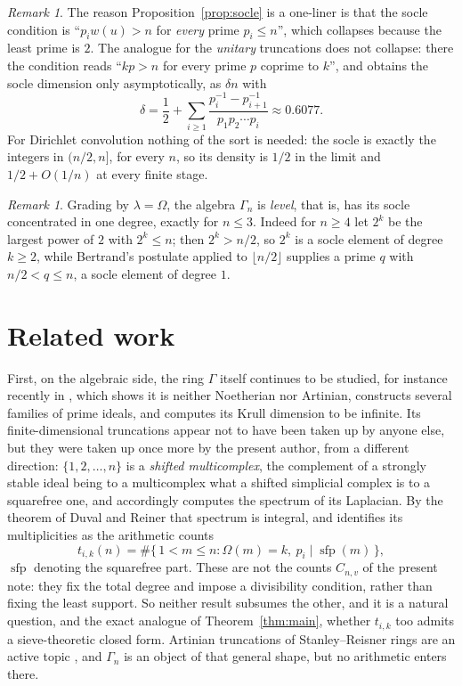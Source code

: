\documentclass[a4paper,11pt,oneside,reqno]{amsart}
\theoremstyle{definition}
\theoremstyle{remark}
\newtheorem{remark}[definition]{Remark}
\theoremstyle{plain}
\newcommand{\Om}{\Omega}
\newcommand{\Gam}{\Gamma}
\begin{document}
\begin{remark}\label{rem:unitary}
  The reason Proposition~\ref{prop:socle} is a one-liner is that the socle
  condition is ``\(p_iw(u) > n\) for \emph{every} prime \(p_i \le n\)'', which
  collapses because the least prime is \(2\). The analogue for the
  \emph{unitary} truncations does not collapse: there the condition reads
  ``\(kp > n\) for every prime \(p\) coprime to \(k\)'', and
  \cite[\S7]{SnellmanUnitaryN} obtains the socle dimension only
  asymptotically, as \(\delta n\) with
  \[
    \delta = \frac{1}{2}+\sum_{i \ge 1}
      \frac{p_i^{-1}-p_{i+1}^{-1}}{p_1p_2\cdots p_i} \approx 0.6077 .
  \]
  For Dirichlet convolution nothing of the sort is needed: the socle is
  exactly the integers in \((n/2,n]\), for every \(n\), so its density is
  \(1/2\) in the limit and \(1/2+O(1/n)\) at every finite stage.
\end{remark}

\begin{remark}
  Grading by \(\lambda = \Om\), the algebra \(\Gam_n\) is \emph{level}, that is,
  has its socle concentrated in one degree, exactly for \(n \le 3\). Indeed for \(n \ge 4\)
  let \(2^{k}\) be the largest power of \(2\) with \(2^{k} \le n\); then
  \(2^{k} > n/2\), so \(2^{k}\) is a socle element of degree \(k \ge 2\), while
  Bertrand's postulate applied to \(\lfloor n/2\rfloor\) supplies a prime
  \(q\) with \(n/2 < q \le n\), a socle element of degree \(1\).
\end{remark}

\section{Related work}\label{sec:related}

First, on the algebraic side, the ring \(\Gam\) itself continues to be studied, for instance recently in \cite{GoswamiKleynPorrill}, which shows it is neither
Noetherian nor Artinian, constructs several families of prime ideals, and
computes its Krull dimension to be infinite. Its finite-dimensional truncations
appear not to have been taken up by anyone else, but they were taken up once
more by the present author, from a different direction: \(\{1,2,\dots,n\}\) is
a \emph{shifted multicomplex}, the complement of a strongly stable ideal being
to a multicomplex what a shifted simplicial complex is to a squarefree one, and
\cite{SnellmanLaplacians} accordingly computes the spectrum of its Laplacian.
By the theorem of Duval and Reiner \cite{DuvalReiner} that spectrum is integral,
and \cite[Cor.~14]{SnellmanLaplacians} identifies its multiplicities as the
arithmetic counts
\[
  t_{i,k}(n) = \#\{\,1 < m \le n : \Om(m) = k,\ p_i \mid \operatorname{sfp}(m)\,\},
\]
\(\operatorname{sfp}\) denoting the squarefree part. These are not the counts
\(C_{n,v}\) of the present note: they fix the total degree and impose a
divisibility condition, rather than fixing the least support. So neither
result subsumes the other, and it is a natural question, and the exact analogue
of Theorem~\ref{thm:main}, whether \(t_{i,k}\) too admits a sieve-theoretic
closed form. Artinian truncations of Stanley--Reisner rings are an active topic
\cite{Miyashita}, and \(\Gam_n\) is an object of that general shape, but no
arithmetic enters there.
\end{document}
